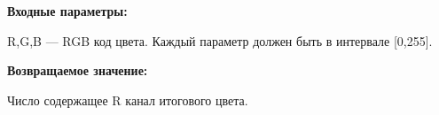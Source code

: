\textbf{Входные параметры:}  

R,G,B --- RGB код цвета. Каждый параметр должен быть в интервале [0,255].

\textbf{Возвращаемое значение:}

Число содержащее R канал итогового цвета.